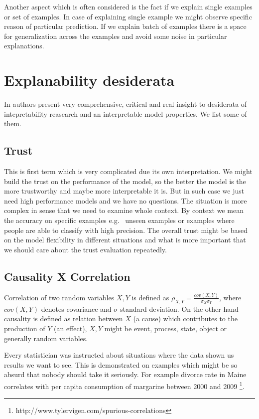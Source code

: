 Another aspect which is often considered is the fact if we explain single examples or set of examples. In case of explaining single example we might observe specific reason of particular prediction. If we explain batch of examples there is a space for generalization across the examples and avoid some noise in particular explanations.


\section{Explanability desiderata}
In \cite{Lipton2016} authors present very comprehensive, critical and real insight to desiderata of intepretability reasearch and an interpretable model properties. We list some of them.

\subsection{Trust}
This is first term which is very complicated due its own interpretation. We might build the trust on the performance of the model, so the better the model is the more trustworthy and maybe more interpretable it is. But in such case we just need high performance models and we have no questions. The situation is more complex in sense that we need to examine whole context. By context we mean the accuracy on specific examples e.g. \ unseen examples or examples where people are able to classify with high precision. The overall trust might be based on the model flexibility in different situations and what is more important that we should care about the trust evaluation repeatedly.

\subsection{Causality X Correlation}
Correlation of two random variables $X,Y$ is defined as $\rho_{X,Y}=\frac{cov(X,Y)}{\sigma_X\sigma_Y}$, where $cov(X,Y)$ denotes covariance and $\sigma$ standard deviation. On the other hand causality is defined as relation between $X$ (a cause) which contributes to the production of $Y$ (an effect), $X,Y$ might be event, process, state, object or generally random variables.

Every statistician was instructed about situations where the data shown us results we want to see. This is demonstrated on examples which might be so absurd that nobody should take it seriously. For example divorce rate in Maine correlates with per capita consumption of margarine between 2000 and 2009 \footnote{http://www.tylervigen.com/spurious-correlations}.

